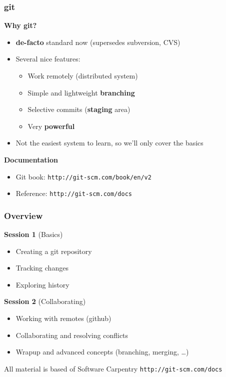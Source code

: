 \documentclass{beamer}
\begin{document}

\begin{frame}
  \frametitle{git}
  \textbf{\Large Why git?}
  \begin{itemize}
  \item \textbf{de-facto} standard now (supersedes subversion, CVS)
  \item Several nice features:
    \begin{itemize}
      \item Work remotely (distributed system)
      \item Simple and lightweight \textbf{branching}
      \item Selective commits (\textbf{staging} area)
      \item Very \textbf{powerful}
    \end{itemize}
  \item Not the easiest system to learn, so we'll only cover the basics
  \end{itemize}
  \vspace{2ex}
  \textbf{\Large Documentation}
  \begin{itemize}
  \item Git book: \texttt{http://git-scm.com/book/en/v2}
  \item Reference: \texttt{http://git-scm.com/docs}
  \end{itemize}
\end{frame}


\begin{frame}
  \frametitle{Overview}
  \textbf{\Large Session 1} (Basics)
  \begin{itemize}
  \item Creating a git repository
  \item Tracking changes
  \item Exploring history
  \end{itemize}
  \vspace{2ex}
  \textbf{\Large Session 2} (Collaborating)
  \begin{itemize}
  \item Working with remotes (github)
  \item Collaborating and resolving conflicts
  \item Wrapup and advanced concepts (branching, merging, \dots)
  \end{itemize}
  \vspace{2ex}
  All material is based of Software Carpentry \texttt{http://git-scm.com/docs}
\end{frame}
\end{document}
